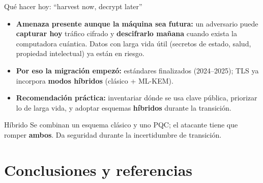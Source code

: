\documentclass[aspectratio=169]{beamer}
\begin{document}
\begin{frame}{Qué hacer hoy: ``harvest now, decrypt later''}
  \begin{itemize}
    \item \textbf{Amenaza presente aunque la máquina sea futura:}
          un adversario puede \textbf{capturar hoy} tráfico cifrado y
          \textbf{descifrarlo mañana} cuando exista la computadora cuántica.
          Datos con larga vida útil (secretos de estado, salud, propiedad
          intelectual) ya están en riesgo.
    \item \textbf{Por eso la migración empezó:} estándares finalizados
          (2024--2025); TLS ya incorpora \textbf{modos híbridos}
          (clásico + ML-KEM).
    \item \textbf{Recomendación práctica:} inventariar dónde se usa clave
          pública, priorizar lo de larga vida, y adoptar esquemas
          \textbf{híbridos} durante la transición.
  \end{itemize}

  \begin{exampleblock}{Híbrido}
    \small Se combinan un esquema clásico y uno PQC; el atacante tiene que
    romper \textbf{ambos}. Da seguridad durante la incertidumbre de transición.
  \end{exampleblock}

\end{frame}

\section{Conclusiones y referencias}
\end{document}
